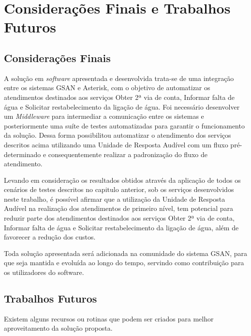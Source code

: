 \chapter[Considerações Finais e Trabalhos Futuros]{\textbf{C}onsiderações Finais e \textbf{T}rabalhos Futuros}

\section{Considerações Finais}
A solução em \textit{software} apresentada e desenvolvida trata-se de uma integração entre os sistemas GSAN e Asterisk, com o objetivo de automatizar os atendimentos destinados aos serviços Obter 2ª via de conta, Informar falta de água e Solicitar restabelecimento da ligação de água. Foi necessário desenvolver um \textit{Middleware} para intermediar a comunicação entre os sistemas e posteriormente uma suíte de testes automatizadas para garantir o funcionamento da solução. Dessa forma possibilitou automatizar o atendimento dos serviços descritos acima utilizando uma Unidade de Resposta Audível com um fluxo pré-determinado e consequentemente realizar a padronização do fluxo de atendimento.

Levando em consideração os resultados obtidos através da aplicação de todos os cenários de testes descritos no capitulo anterior, sob os serviços desenvolvidos neste trabalho, é possível afirmar que a utilização da Unidade de Resposta Audível na realização dos atendimentos de primeiro nível, tem potencial para reduzir parte dos atendimentos destinados aos serviços Obter 2ª via de conta, Informar falta de água e Solicitar restabelecimento da ligação de água, além de favorecer a redução dos custos.

Toda solução apresentada será adicionada na comunidade do sistema GSAN, para que seja mantida e evoluída ao longo do tempo, servindo como contribuição para os utilizadores do software.

\section{Trabalhos Futuros}

Existem alguns recursos ou rotinas que podem ser criados para melhor aproveitamento da solução proposta.

